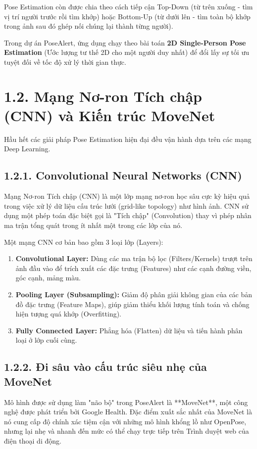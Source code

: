 \documentclass[12pt,a4paper]{report}
\begin{document}
Pose Estimation còn được chia theo cách tiếp cận Top-Down (từ trên xuống - tìm vị trí người trước rồi tìm khớp) hoặc Bottom-Up (từ dưới lên - tìm toàn bộ khớp trong ảnh sau đó ghép nối chúng lại thành từng người). 

Trong dự án PoseAlert, ứng dụng chạy theo bài toán \textbf{2D Single-Person Pose Estimation} (Ước lượng tư thế 2D cho một người duy nhất) để đổi lấy sự tối ưu tuyệt đối về tốc độ xử lý thời gian thực.

\section{1.2. Mạng Nơ-ron Tích chập (CNN) và Kiến trúc MoveNet}
Hầu hết các giải pháp Pose Estimation hiện đại đều vận hành dựa trên các mạng Deep Learning.

\subsection{1.2.1. Convolutional Neural Networks (CNN)}
Mạng Nơ-ron Tích chập (CNN) là một lớp mạng nơ-ron học sâu cực kỳ hiệu quả trong việc xử lý dữ liệu cấu trúc lưới (grid-like topology) như hình ảnh. CNN sử dụng một phép toán đặc biệt gọi là "Tích chập" (Convolution) thay vì phép nhân ma trận tổng quát trong ít nhất một trong các lớp của nó.

Một mạng CNN cơ bản bao gồm 3 loại lớp (Layers):
\begin{enumerate}
    \item \textbf{Convolutional Layer:} Dùng các ma trận bộ lọc (Filters/Kernels) trượt trên ảnh đầu vào để trích xuất các đặc trưng (Features) như các cạnh đường viền, góc cạnh, mảng màu.
    \item \textbf{Pooling Layer (Subsampling):} Giảm độ phân giải không gian của các bản đồ đặc trưng (Feature Maps), giúp giảm thiểu khối lượng tính toán và chống hiện tượng quá khớp (Overfitting).
    \item \textbf{Fully Connected Layer:} Phẳng hóa (Flatten) dữ liệu và tiến hành phân loại ở lớp cuối cùng.
\end{enumerate}

\subsection{1.2.2. Đi sâu vào cấu trúc siêu nhẹ của MoveNet}
Mô hình được sử dụng làm "não bộ" trong PoseAlert là **MoveNet**, một công nghệ được phát triển bởi Google Health. Đặc điểm xuất sắc nhất của MoveNet là nó cung cấp độ chính xác tiệm cận với những mô hình khổng lồ như OpenPose, nhưng lại nhẹ và nhanh đến mức có thể chạy trực tiếp trên Trình duyệt web của điện thoại di động.
\end{document}

